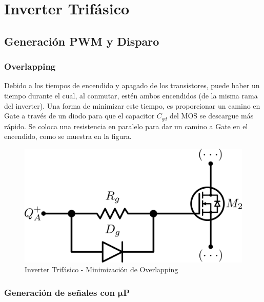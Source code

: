 \documentclass[e4_tp3_main.tex]{subfiles}
\begin{document}

\section{Inverter Trifásico}

\subsection{Generación PWM y Disparo}

\subsubsection{Overlapping}

Debido a los tiempos de encendido y apagado de los transistores, puede haber un tiempo durante el cual, al conmutar, estén ambos encendidos (de la misma rama del inverter). Una forma de minimizar este tiempo, es proporcionar un camino en Gate a través de un diodo para que el capacitor $C_{gd}$ del MOS se descargue más rápido. Se coloca una resistencia en paralelo para dar un camino a Gate en el encendido, como se muestra en la figura.

\begin{figure}[H]
\centering
\includegraphics[width=0.6\linewidth]{Imagenes/overlap.png}
\caption{Inverter Trifásico - Minimización de Overlapping}
\end{figure}

\subsubsection{Generación de señales con $\mathbf{\mu}$P}
\end{document}

